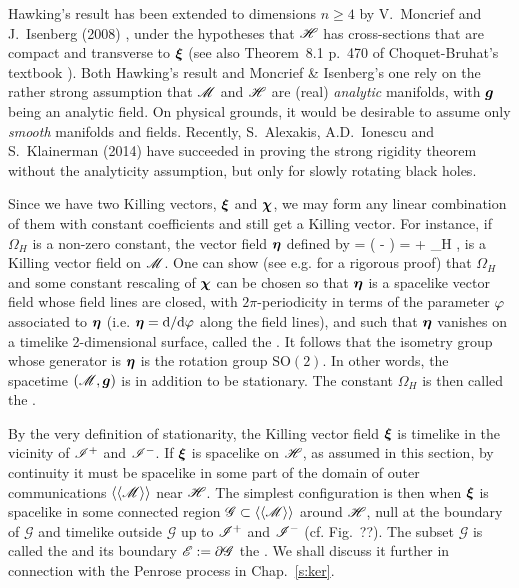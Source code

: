 Hawking's result has been extended to dimensions $n\geq 4$ by V.~Moncrief
and J.~Isenberg (2008) \cite{MoncrI08}, under the hypotheses that $\mathscr{H}$
has cross-sections that are compact and transverse to $\bm{\xi}$ (see also
Theorem~8.1 p.~470 of Choquet-Bruhat's textbook \cite{Choqu09}).
Both Hawking's result
and Moncrief \& Isenberg's one rely on the rather strong assumption that $\mathscr{M}$ and $\mathscr{H}$
are (real) \emph{analytic} manifolds, with $\bm{g}$ being an analytic field. On physical grounds,
it would be desirable to assume only \emph{smooth} manifolds and fields.
Recently, S.~Alexakis, A.D.~Ionescu and S.~Klainerman \cite{AlexaIK14} (2014)
have succeeded in proving the strong rigidity theorem without the analyticity
assumption, but only for slowly rotating black holes.

Since we have two Killing vectors, $\bm{\xi}$ and $\bm{\chi}$, we may
form any linear combination of them with constant coefficients
and still get a Killing vector. For instance, if $\Omega_H$ is a non-zero constant,
the vector field $\bm{\eta}$ defined by
\be
    \w{\eta} =  \left( \w{\chi} - \w{\xi} \right)
    \quad\iff\quad
    \w{\chi} = \w{\xi} + \Omega_H \w{\eta} ,
\ee
is a Killing vector field on $\mathscr{M}$.
One can show (see e.g. \cite{Chrus97} for a rigorous proof) that $\Omega_H$
and some constant rescaling of $\bm{\chi}$
can be chosen so that $\bm{\eta}$ is a spacelike vector field whose
field lines are closed, with $2\pi$-periodicity in terms of the parameter $\varphi$
associated to $\bm{\eta}$ (i.e. $\bm{\eta} = \mathrm{d}/\mathrm{d}\varphi$ along the field lines),
and such that $\bm{\eta}$ vanishes on a timelike 2-dimensional surface, called
the .
It follows that
the isometry group whose generator is $\bm{\eta}$ is the rotation group
$\mathrm{SO}(2)$. In other words, the spacetime $(\mathscr{M},\bm{g})$ is
 in addition to be stationary.
The constant $\Omega_H$ is then called the
.

By the very definition of stationarity, the Killing vector field $\bm{\xi}$ is
timelike in the vicinity of $\mathscr{I}^+$ and $\mathscr{I}^-$. If $\bm{\xi}$ is spacelike
on $\mathscr{H}$, as assumed in this section, by continuity it must be spacelike
in some part of the domain of outer communications $\langle\langle \mathscr{M}\rangle\rangle$
near $\mathscr{H}$. The simplest configuration is then when
$\bm{\xi}$ is spacelike in some connected region $\mathscr{G}\subset \langle\langle \mathscr{M}\rangle\rangle$
around $\mathscr{H}$, null at the boundary of $\mathscr{G}$ and timelike outside $\mathscr{G}$
up to $\mathscr{I}^+$ and $\mathscr{I}^-$ (cf. Fig.~??). The subset $\mathscr{G}$ is
called the  and its boundary $\mathscr{E}:=\partial\mathscr{G}$
the . We shall discuss it further in connection with
the Penrose process in Chap.~\ref{s:ker}.


